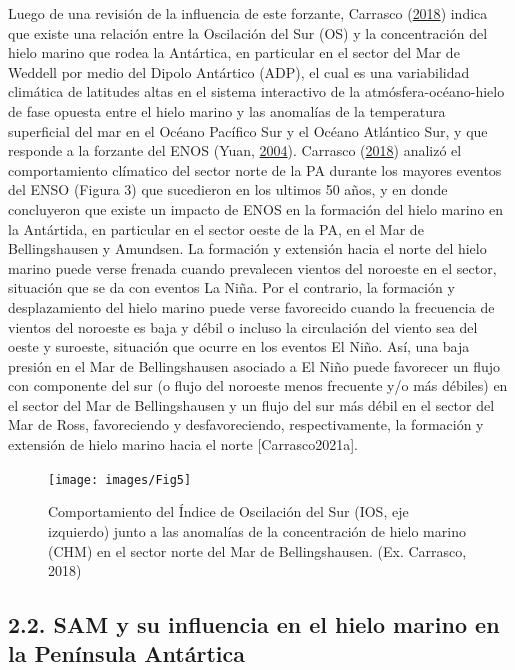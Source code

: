\documentclass[
]{article}
\begin{document}
Luego de una revisión de la influencia de este forzante, Carrasco
(\protect\hyperlink{ref-Carrasco2018}{2018}) indica que existe una
relación entre la Oscilación del Sur (OS) y la concentración del hielo
marino que rodea la Antártica, en particular en el sector del Mar de
Weddell por medio del Dipolo Antártico (ADP), el cual es una
variabilidad climática de latitudes altas en el sistema interactivo de
la atmósfera-océano-hielo de fase opuesta entre el hielo marino y las
anomalías de la temperatura superficial del mar en el Océano Pacífico
Sur y el Océano Atlántico Sur, y que responde a la forzante del ENOS
(Yuan, \protect\hyperlink{ref-Yuan2004}{2004}). Carrasco
(\protect\hyperlink{ref-Carrasco2018}{2018}) analizó el comportamiento
clímatico del sector norte de la PA durante los mayores eventos del ENSO
(Figura 3) que sucedieron en los ultimos 50 años, y en donde concluyeron
que existe un impacto de ENOS en la formación del hielo marino en la
Antártida, en particular en el sector oeste de la PA, en el Mar de
Bellingshausen y Amundsen. La formación y extensión hacia el norte del
hielo marino puede verse frenada cuando prevalecen vientos del noroeste
en el sector, situación que se da con eventos La Niña. Por el contrario,
la formación y desplazamiento del hielo marino puede verse favorecido
cuando la frecuencia de vientos del noroeste es baja y débil o incluso
la circulación del viento sea del oeste y suroeste, situación que ocurre
en los eventos El Niño. Así, una baja presión en el Mar de
Bellingshausen asociado a El Niño puede favorecer un flujo con
componente del sur (o flujo del noroeste menos frecuente y/o más
débiles) en el sector del Mar de Bellingshausen y un flujo del sur más
débil en el sector del Mar de Ross, favoreciendo y desfavoreciendo,
respectivamente, la formación y extensión de hielo marino hacia el norte
{[}Carrasco2021a{]}.

\begin{figure}

{\centering \texttt{[image: images/Fig5]} 

}

\caption{Comportamiento del Índice de Oscilación del Sur (IOS, eje izquierdo) junto a las anomalías de la concentración de hielo marino (CHM) en el sector norte del Mar de Bellingshausen. (Ex. Carrasco, 2018)}\label{fig:unnamed-chunk-3}
\end{figure}

\pagebreak

\hypertarget{sam-y-su-influencia-en-el-hielo-marino-en-la-penuxednsula-antuxe1rtica}{%
\subsection{2.2. SAM y su influencia en el hielo marino en la Península
Antártica}\label{sam-y-su-influencia-en-el-hielo-marino-en-la-penuxednsula-antuxe1rtica}}
\end{document}
